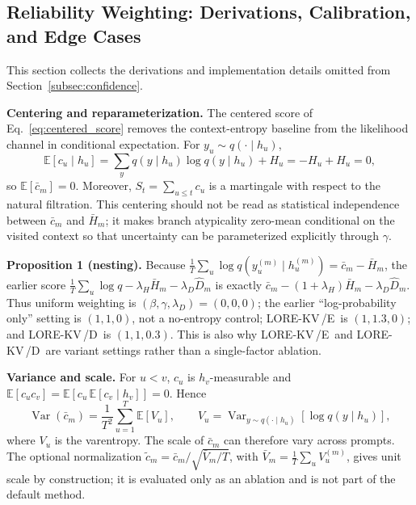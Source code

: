 \documentclass{article} %
\newcommand{\lorekvE}{LORE-KV\,/E}
\newcommand{\lorekvD}{LORE-KV\,/D}
\begin{document}
\subsection{Reliability Weighting: Derivations, Calibration, and Edge Cases}
\label{app:reliability_details}

This section collects the derivations and implementation details omitted from Section~\ref{subsec:confidence}.

\textbf{Centering and reparameterization.}
The centered score of Eq.~\eqref{eq:centered_score} removes the context-entropy baseline from the likelihood channel in conditional expectation. For $y_u\sim q(\cdot\mid h_u)$,
\begin{equation}
\mathbb{E}[c_u\mid h_u]
=\sum_y q(y\mid h_u)\log q(y\mid h_u)+H_u
=-H_u+H_u=0,
\label{eq:centering}
\end{equation}
so $\mathbb{E}[\bar c_m]=0$. Moreover, $S_t=\sum_{u\le t}c_u$ is a martingale with respect to the natural filtration. This centering should not be read as statistical independence between $\bar c_m$ and $\bar H_m$; it makes branch atypicality zero-mean conditional on the visited context so that uncertainty can be parameterized explicitly through $\gamma$.

\textbf{Proposition 1 (nesting).}
Because $\tfrac1T\sum_u\log q(y^{(m)}_u\mid h^{(m)}_u)=\bar c_m-\bar H_m$, the earlier score
$\tfrac1T\sum_u\log q-\lambda_H\bar H_m-\lambda_D\hat D_m$
is exactly
$\bar c_m-(1+\lambda_H)\bar H_m-\lambda_D\hat D_m$.
Thus uniform weighting is $(\beta,\gamma,\lambda_D)=(0,0,0)$; the earlier ``log-probability only'' setting is $(1,1,0)$, not a no-entropy control; \lorekvE\ is $(1,1.3,0)$; and \lorekvD\ is $(1,1,0.3)$. This is also why \lorekvE\ and \lorekvD\ are variant settings rather than a single-factor ablation.

\textbf{Variance and scale.}
For $u<v$, $c_u$ is $h_v$-measurable and $\mathbb{E}[c_uc_v]=\mathbb{E}[c_u\,\mathbb{E}[c_v\mid h_v]]=0$. Hence
\begin{equation}
\operatorname{Var}(\bar c_m)
=\frac{1}{T^2}\sum_{u=1}^{T}\mathbb{E}[V_u],
\qquad
V_u=\operatorname{Var}_{y\sim q(\cdot\mid h_u)}[\log q(y\mid h_u)],
\label{eq:varentropy}
\end{equation}
where $V_u$ is the varentropy. The scale of $\bar c_m$ can therefore vary across prompts. The optional normalization
$\tilde c_m=\bar c_m/\sqrt{\bar V_m/T}$, with $\bar V_m=\tfrac1T\sum_uV^{(m)}_u$, gives unit scale by construction; it is evaluated only as an ablation and is not part of the default method.
\end{document}
